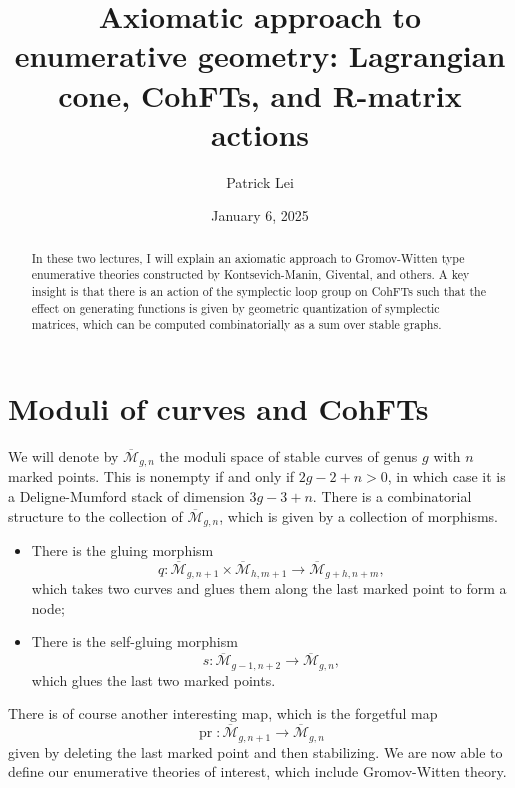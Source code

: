 \documentclass{amsart}
\title[Axiomatic enumerative geometry]{Axiomatic approach to enumerative geometry: Lagrangian cone, CohFTs, and R-matrix actions}
\author{Patrick Lei}
\date{January 6, 2025}
\theoremstyle{definition}
\theoremstyle{remark}
\theoremstyle{plain}
\theoremstyle{definition}
\theoremstyle{remark}
\newcommand{\Mbar}{\overline{\mathcal{M}}}
\newcommand{\1}{\mathbf{1}}
\newcommand{\2}{\mathbf{2}}
\newcommand{\3}{\mathbf{3}}
\DeclareMathOperator{\pr}{pr}
\begin{document}
    
\begin{abstract}
    In these two lectures, I will explain an axiomatic approach to Gromov-Witten type enumerative theories constructed by Kontsevich-Manin, Givental, and others. A key insight is that there is an action of the symplectic loop group on CohFTs such that the effect on generating functions is given by geometric quantization of symplectic matrices, which can be computed combinatorially as a sum over stable graphs.
\end{abstract}

\maketitle

\tableofcontents

\section{Moduli of curves and CohFTs}%
\label{sec:Moduli of curves and CohFTs}

We will denote by $\Mbar_{g,n}$ the moduli space of stable curves of genus $g$ with $n$ marked points. This is nonempty if and only if $2g-2+n > 0$, in which case it is a Deligne-Mumford stack of dimension $3g-3+n$. There is a combinatorial structure to the collection of $\Mbar_{g,n}$, which is given by a collection of morphisms.
\begin{itemize}
    \item There is the gluing morphism 
        \[q \colon \Mbar_{g,n+1} \times \Mbar_{h, m+1} \to \Mbar_{g+h,n+m}, \] 
        which takes two curves and glues them along the last marked point to form a node;
    \item There is the self-gluing morphism \[s \colon \Mbar_{g-1,n+2} \to \Mbar_{g,n},\] 
        which glues the last two marked points.
\end{itemize}
There is of course another interesting map, which is the forgetful map
\[ \pr \colon \Mbar_{g,n+1} \to \Mbar_{g,n} \]
given by deleting the last marked point and then stabilizing. We are now able to define our enumerative theories of interest, which include Gromov-Witten theory.
\end{document}

